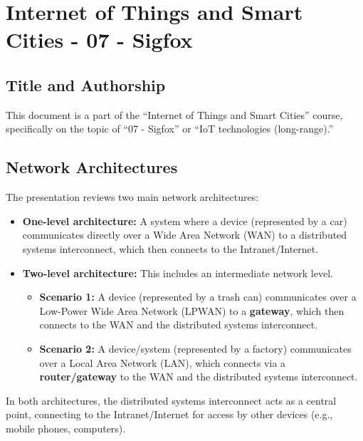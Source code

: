 \documentclass[a4paper, 12pt]{book} %
\begin{document}
\chapter{Internet of Things and Smart Cities - 07 -
Sigfox}\label{internet-of-things-and-smart-cities---07---sigfox}

\section{Title and Authorship}\label{title-and-authorship}

This document is a part of the ``Internet of Things and Smart Cities''
course, specifically on the topic of ``07 - Sigfox'' or ``IoT
technologies (long-range).''

\section{Network Architectures}\label{network-architectures}

The presentation reviews two main network architectures:

\begin{itemize}
\tightlist
\item
  \textbf{One-level architecture:} A system where a device (represented
  by a car) communicates directly over a Wide Area Network (WAN) to a
  distributed systems interconnect, which then connects to the
  Intranet/Internet.
\item
  \textbf{Two-level architecture:} This includes an intermediate network
  level.

  \begin{itemize}
  \tightlist
  \item
    \textbf{Scenario 1:} A device (represented by a trash can)
    communicates over a Low-Power Wide Area Network (LPWAN) to a
    \textbf{gateway}, which then connects to the WAN and the distributed
    systems interconnect.
  \item
    \textbf{Scenario 2:} A device/system (represented by a factory)
    communicates over a Local Area Network (LAN), which connects via a
    \textbf{router/gateway} to the WAN and the distributed systems
    interconnect.
  \end{itemize}
\end{itemize}

In both architectures, the distributed systems interconnect acts as a
central point, connecting to the Intranet/Internet for access by other
devices (e.g., mobile phones, computers).
\end{document}
